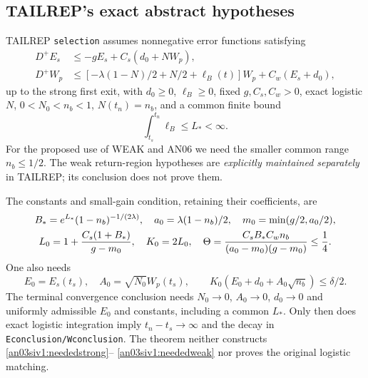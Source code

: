 \documentclass[11pt]{article}
\numberwithin{equation}{section}
\theoremstyle{remark}\newtheorem{remark}[proposition]{Remark}
\begin{document}
\subsection*{TAILREP's exact abstract hypotheses}
TAILREP \texttt{selection} assumes nonnegative error functions satisfying
\begin{align}
 D^+E_s&\le-gE_s+C_s(d_0+NW_p),\label{an03siv1:neededstrong}\\
 D^+W_p&\le[-\lambda(1-N)/2+N/2+\ell_B(t)]W_p
                             +C_w(E_s+d_0),
 \label{an03siv1:neededweak}
\end{align}
up to the strong first exit, with $d_0\ge0$, $\ell_B\ge0$,
fixed $g,C_s,C_w>0$, exact logistic $N$, $0<N_0<n_b<1$,
$N(t_n)=n_b$, and a common finite bound
\begin{equation}
 \int_{t_s}^{t_n}\ell_B\le L_*<\infty.
 \label{an03siv1:ellbudget}
\end{equation}
For the proposed use of WEAK and AN06 we need the smaller common
range $n_b\le1/2$. The weak return-region hypotheses are
\emph{explicitly maintained separately} in TAILREP; its conclusion
does not prove them.

The constants and small-gain condition, retaining their coefficients, are
\begin{gather}
 B_*=e^{L_*}(1-n_b)^{-1/(2\lambda)},\quad
 a_0=\lambda(1-n_b)/2,\quad m_0=\min(g/2,a_0/2),\notag\\
 L_0=1+\frac{C_s(1+B_*)}{g-m_0},\quad K_0=2L_0,\quad
 \Theta=\frac{C_sB_*C_wn_b}{(a_0-m_0)(g-m_0)}\le\frac14.
 \label{an03siv1:smallgain}
\end{gather}
One also needs
\begin{equation}
 E_0=E_s(t_s),\quad A_0=\sqrt{N_0}W_p(t_s),\qquad
 K_0(E_0+d_0+A_0\sqrt{n_b})\le\delta/2.
 \label{an03siv1:initialguard}
\end{equation}
The terminal convergence conclusion needs $N_0\to0$, $A_0\to0$,
$d_0\to0$ and uniformly admissible $E_0$ and constants, including
a common $L_*$. Only then does exact logistic integration imply
$t_n-t_s\to\infty$ and the decay in \texttt{Econclusion/Wconclusion}.
The theorem neither constructs \eqref{an03siv1:neededstrong}--
\eqref{an03siv1:neededweak} nor proves the original logistic matching.
\end{document}
